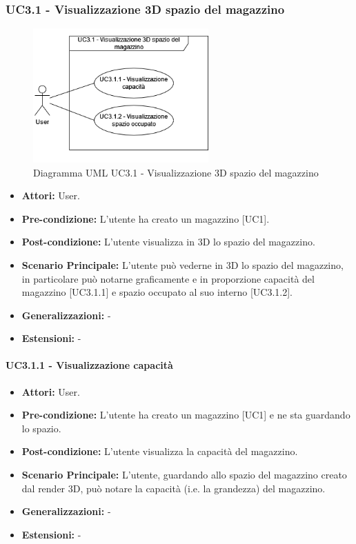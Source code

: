 \subsubsection{UC3.1 - Visualizzazione 3D spazio del magazzino}
\begin{figure}[H]
  \centering
  \includegraphics[width=0.6\textwidth]{UC_diagrams_1-10/UC3.1.drawio.png}
   \caption{Diagramma UML UC3.1 - Visualizzazione 3D spazio del magazzino}
\end{figure}
\begin{itemize}
    \item \textbf{Attori:} User.
    \item \textbf{Pre-condizione:} L'utente ha creato un magazzino [UC1].
    \item \textbf{Post-condizione:} L'utente visualizza in 3D lo spazio del magazzino.
    \item \textbf{Scenario Principale:}  L'utente può vederne in 3D lo spazio del magazzino, in particolare può notarne graficamente e in proporzione capacità del magazzino [UC3.1.1] e spazio occupato al suo interno [UC3.1.2].
    \item \textbf{Generalizzazioni:} -
    \item \textbf{Estensioni:} -
\end{itemize}


\paragraph{UC3.1.1 - Visualizzazione capacità}
\begin{itemize}
    \item \textbf{Attori:} User.
    \item \textbf{Pre-condizione:} L'utente ha creato un magazzino [UC1] e ne sta guardando lo spazio.
    \item \textbf{Post-condizione:} L'utente visualizza la capacità del magazzino.
    \item \textbf{Scenario Principale:}  L'utente, guardando allo spazio del magazzino creato dal render 3D, può notare la capacità (i.e. la grandezza) del magazzino.
    \item \textbf{Generalizzazioni:} -
    \item \textbf{Estensioni:} -
\end{itemize}


